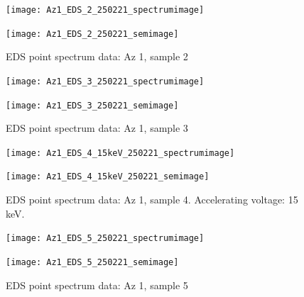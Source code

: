 \begin{figure}[H]
\centering
\begin{minipage}{.45\textwidth}
  \centering
  \texttt{[image: Az1\_EDS\_2\_250221\_spectrumimage]}
\end{minipage}
\begin{minipage}{.45\textwidth}
  \centering
  \texttt{[image: Az1\_EDS\_2\_250221\_semimage]}
\end{minipage}
\caption[EDS point spectrum data: Az 1, sample 2]{EDS point spectrum data: Az 1, sample 2}
\label{fig:az1_point_eds_2}
\end{figure}

\begin{figure}[H]
\centering
\begin{minipage}{.45\textwidth}
  \centering
  \texttt{[image: Az1\_EDS\_3\_250221\_spectrumimage]}
\end{minipage}
\begin{minipage}{.45\textwidth}
  \centering
  \texttt{[image: Az1\_EDS\_3\_250221\_semimage]}
\end{minipage}
\caption[EDS point spectrum data: Az 1, sample 3]{EDS point spectrum data: Az 1, sample 3}
\label{fig:az1_point_eds_3}
\end{figure}

\begin{figure}[H]
\centering
\begin{minipage}{.45\textwidth}
  \centering
  \texttt{[image: Az1\_EDS\_4\_15keV\_250221\_spectrumimage]}
\end{minipage}
\begin{minipage}{.45\textwidth}
  \centering
  \texttt{[image: Az1\_EDS\_4\_15keV\_250221\_semimage]}
\end{minipage}
\caption[EDS point spectrum data: Az 1, sample 4]{EDS point spectrum data: Az 1, sample 4. Accelerating voltage: 15 keV.}
\label{fig:az1_point_eds_4}
\end{figure}

\begin{figure}[H]
\centering
\begin{minipage}{.45\textwidth}
  \centering
  \texttt{[image: Az1\_EDS\_5\_250221\_spectrumimage]}
\end{minipage}
\begin{minipage}{.45\textwidth}
  \centering
  \texttt{[image: Az1\_EDS\_5\_250221\_semimage]}
\end{minipage}
\caption[EDS point spectrum data: Az 1, sample 5]{EDS point spectrum data: Az 1, sample 5}
\label{fig:az1_point_eds_5}
\end{figure}

